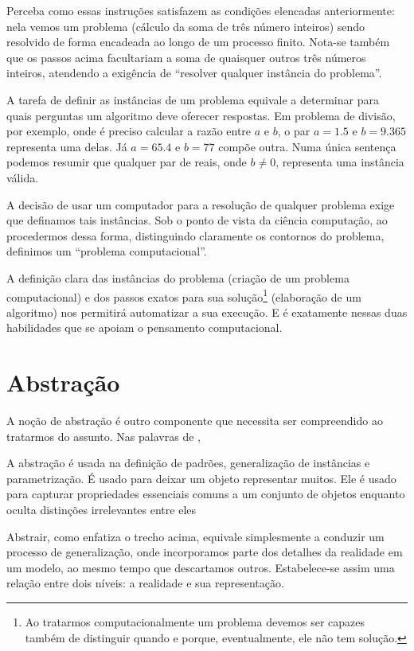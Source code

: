 Perceba como essas instruções satisfazem as condições elencadas anteriormente: nela vemos um problema (cálculo da soma de três número inteiros) sendo resolvido de forma encadeada ao longo de um processo finito. Nota-se também que os passos acima facultariam a soma de quaisquer outros três números inteiros, atendendo a exigência de ``resolver qualquer instância do problema''. 

A tarefa de definir as instâncias de um problema equivale a determinar para quais perguntas um algoritmo deve oferecer respostas. Em problema de divisão, por exemplo, onde é preciso calcular a razão entre $a$ e $b$, o par $a=1.5$ e $b=9.365$ representa uma delas. Já $a=65.4$ e $b=77$ compõe outra. Numa única sentença podemos resumir que qualquer par de reais, onde $b\neq0$, representa uma instância válida. 

A decisão de usar um computador para a resolução de qualquer problema exige que definamos tais instâncias. Sob o ponto de vista da ciência computação, ao procedermos dessa forma, distinguindo claramente os contornos do problema, definimos um ``problema computacional''.  

A definição clara das instâncias do problema (criação de um problema computacional) e dos passos exatos para sua solução\footnote{Ao tratarmos computacionalmente um problema devemos ser capazes também de distinguir quando e porque, eventualmente, ele não tem solução.} (elaboração de um algoritmo) nos permitirá automatizar a sua execução. E é exatamente nessas duas habilidades que se apoiam o pensamento computacional.

\section{Abstração}

A noção de abstração é outro componente que necessita ser compreendido ao tratarmos do assunto. Nas palavras de ,

\begin{citacao}
A abstração é usada na definição de padrões, generalização de instâncias e parametrização. É usado para deixar um objeto representar muitos. Ele é usado para capturar propriedades essenciais comuns a um conjunto de objetos enquanto oculta distinções irrelevantes entre eles \cite[p.~1. Tradução nossa]{wing2006}
\end{citacao}

Abstrair, como enfatiza o trecho acima, equivale simplesmente a conduzir um processo de generalização, onde incorporamos parte dos detalhes da realidade em um modelo, ao mesmo tempo que descartamos outros. Estabelece-se assim uma relação entre dois níveis: a realidade e sua representação.

